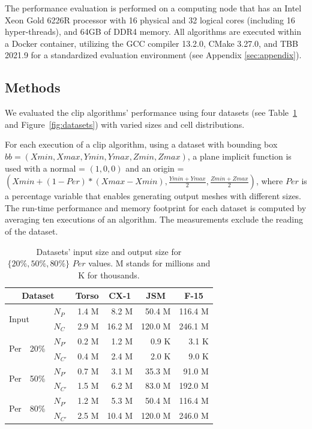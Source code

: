 \documentclass{egpubl}
\begin{document}
The performance evaluation is performed on a computing node that has an Intel Xeon Gold 6226R processor with 16 physical and 32 logical cores (including 16 hyper-threads), and 64GB of DDR4 memory. All algorithms are executed within a Docker container, utilizing the GCC compiler 13.2.0, CMake 3.27.0, and TBB 2021.9 for a standardized evaluation environment  (see Appendix \ref{sec:appendix}).

\subsection{Methods}

We evaluated the clip algorithms' performance using four datasets (see Table~\ref{tab:datasets} and Figure~\ref{fig:datasets}) with varied sizes and cell distributions.

For each execution of a clip algorithm, using a dataset with bounding box $bb = (Xmin, Xmax, Ymin, Ymax, Zmin, Zmax)$, a plane implicit function is used with a normal = $(1, 0, 0)$ and an origin = $(Xmin+(1-Per)*(Xmax-Xmin), \frac{Ymin+Ymax}{2}, \frac{Zmin+Zmax}{2})$, where $Per$ is a percentage variable that enables generating output meshes with different sizes. The run-time performance and memory footprint for each dataset is computed by averaging ten executions of an algorithm. The measurements exclude the reading of the dataset.

\begin{table}[H]
\centering
\caption{Datasets' input size and output size for $\{20\%, 50\%, 80\%\}$ $Per$ values. M stands for millions and K for thousands.}
\label{tab:datasets}
\begin{tabular}{lllrrrr}
\toprule
\multicolumn{3}{c}{Dataset}                            & \multicolumn{1}{c}{Torso} & \multicolumn{1}{c}{CX-1} & \multicolumn{1}{c}{JSM} & \multicolumn{1}{c}{F-15} \\
\midrule
\multicolumn{2}{l}{\multirow{2}{*}{Input}}  &   $N_P$    &  1.4 M  &   8.2 M  &   50.4 M  &  116.4 M  \\
\multicolumn{2}{l}{}                        &   $N_C$    &  2.9 M  &  16.2 M  &  120.0 M  &  246.1 M  \\
\midrule
\multirow{2}{*}{Per} & \multirow{2}{*}{20\%} &  $N_{P'}$  &  0.2 M  &   1.2 M  &    0.9 K  &    3.1 K  \\
                     &                      &  $N_{C'}$  &  0.4 M  &   2.4 M  &    2.0 K  &    9.0 K  \\
\midrule
\multirow{2}{*}{Per} & \multirow{2}{*}{50\%} &  $N_{P'}$  &  0.7 M  &   3.1 M  &   35.3 M  &   91.0 M  \\
                     &                      &  $N_{C'}$  &  1.5 M  &   6.2 M  &   83.0 M  &  192.0 M  \\
\midrule
\multirow{2}{*}{Per} & \multirow{2}{*}{80\%} &  $N_{P'}$  &  1.2 M  &   5.3 M  &   50.4 M  &  116.4 M  \\
                     &                      &  $N_{C'}$  &  2.5 M  &  10.4 M  &  120.0 M  &  246.0 M  \\
\bottomrule
\end{tabular}
\end{table}
\end{document}
